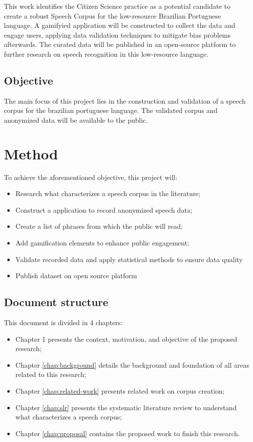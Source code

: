 This work identifies the Citizen Science practice as a potential candidate to create a robust Speech Corpus for the low-resource Brazilian Portuguese language. A gamifyied application will be constructed to collect the data and engage users, applying data validation techniques to mitigate bias problems afterwards. The curated data will be published in an open-source platform to further research on speech recognition in this low-resource language.

\section*{Objective}

The main focus of this project lies in the construction and validation of a speech corpus for the brazilian portuguese language. The validated corpus and anonymized data will be available to the public.

\chapter{Method}

To achieve the aforementioned objective, this project will:

\begin{itemize}
    \item Research what characterizes a speech corpus in the literature;
    \item Construct a application to record anonymized speech data;
    \item Create a list of phrases from which the public will read;
    \item Add gamification elements to enhance public engagement;
    \item Validate recorded data and apply statistical methods to ensure data quality
    \item Publish dataset on open source platform
\end{itemize}

\section{Document structure}

This document is divided in 4 chapters:

\begin{itemize}
    \item Chapter 1 presents the context, motivation, and objective of the proposed research;
    \item Chapter \ref{chap:background} details the background and foundation of all areas related to this research;
    \item Chapter \ref{chap:related-work} presents related work on corpus creation;
    \item Chapter \ref{chap:slr} presents the systematic literature review to understand what characterizes a speech corpus;
    \item Chapter \ref{chap:proposal} contains the proposed work to finish this research.
\end{itemize}
